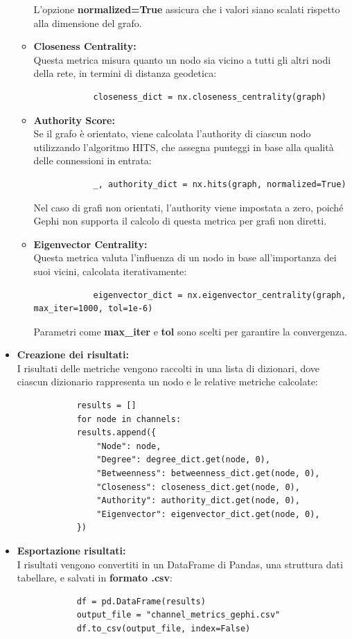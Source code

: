 \documentclass[12pt]{article}
\begin{document}
\begin{itemize}[label=]
\begin{itemize}
\begin{lstlisting}
			\end{lstlisting}
			L'opzione \textbf{normalized=True} assicura che i valori siano scalati rispetto alla dimensione del grafo.
			\item \textbf{Closeness Centrality:}\\
			Questa metrica misura quanto un nodo sia vicino a tutti gli altri nodi della rete, in termini di distanza geodetica:
			\begin{lstlisting}
			closeness_dict = nx.closeness_centrality(graph)
			\end{lstlisting}
			\item \textbf{Authority Score:}\\
			Se il grafo è orientato, viene calcolata l'authority di ciascun nodo utilizzando l'algoritmo HITS, che assegna punteggi in base alla qualità delle connessioni in entrata:
			\begin{lstlisting}
			_, authority_dict = nx.hits(graph, normalized=True)
			\end{lstlisting}
			Nel caso di grafi non orientati, l’authority viene impostata a zero, poiché Gephi non supporta il calcolo di questa metrica per grafi non diretti.
			\item \textbf{Eigenvector Centrality:}\\
			Questa metrica valuta l’influenza di un nodo in base all’importanza dei suoi vicini, calcolata iterativamente:
			\begin{lstlisting}
			eigenvector_dict = nx.eigenvector_centrality(graph, max_iter=1000, tol=1e-6)
			\end{lstlisting}
			Parametri come \textbf{max\_iter} e \textbf{tol} sono scelti per garantire la convergenza.
		\end{itemize}
		\item \textbf{Creazione dei risultati:}\\
		I risultati delle metriche vengono raccolti in una lista di dizionari, dove ciascun dizionario rappresenta un nodo e le relative metriche calcolate:
		\begin{lstlisting}
			results = []
			for node in channels:
			results.append({
				"Node": node,
				"Degree": degree_dict.get(node, 0),
				"Betweenness": betweenness_dict.get(node, 0),
				"Closeness": closeness_dict.get(node, 0),
				"Authority": authority_dict.get(node, 0),
				"Eigenvector": eigenvector_dict.get(node, 0),
			})
		\end{lstlisting}
		\item \textbf{Esportazione risultati:}\\
		I risultati vengono convertiti in un DataFrame di Pandas, una struttura dati tabellare, e salvati in \textbf{formato .csv}:
		\begin{lstlisting}
			df = pd.DataFrame(results)
			output_file = "channel_metrics_gephi.csv"
			df.to_csv(output_file, index=False)
		\end{lstlisting}
	\end{itemize}
\end{document}
